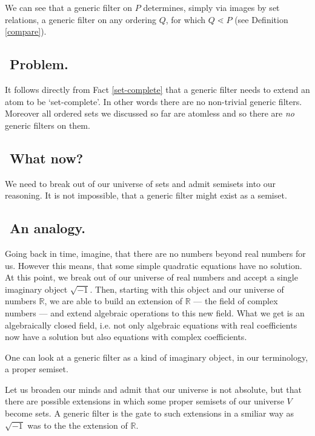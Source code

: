 \medskip

We can see that a generic filter on $P$ determines, simply via images by set relations,
a generic filter on any ordering $Q$, for which $Q \lessdot P$ (see Definition \ref{compare}).


\medskip

\subsection{${}$ \hspace{-1em} Problem.} It follows directly from
Fact \ref{set-complete} that a generic filter needs to extend
an atom to be `set-complete'. In other words there are no non-trivial generic
filters. Moreover all ordered sets we discussed so far are atomless
and so there are \emph{no} generic filters on them.

\subsection{${}$ \hspace{-1em} What now?} We need to
break out of our universe of sets and admit semisets into our
reasoning. It is not impossible, that a generic filter might
exist as a semiset.


\subsection{${}$ \hspace{-1em} An analogy.}
Going back in time, imagine, that there are no numbers
beyond real numbers for us. However this means, that
some simple quadratic equations have no solution. At this
point, we break out of our universe of real numbers and accept
a single imaginary object $\sqrt{-1}$. Then, starting with this object
and our universe of numbers $\mathbb R$,
we are able to build an extension of $\mathbb R$
--- the field of complex numbers --- and extend algebraic operations
to this new field. %
What we get is an algebraically closed field, i.e. not only
algebraic equations with real coefficients now have a solution but also equations with complex coefficients.

One can look at a generic filter as a kind of imaginary object,
in our terminology, a proper semiset.

Let us broaden our minds and admit that our universe is not absolute,
but that there are possible extensions in which some proper
semisets of our universe $V$ become sets. %
A generic filter is the gate to such extensions in a smiliar way as $\sqrt{-1}$ was
to the the extension of $\mathbb R$.

